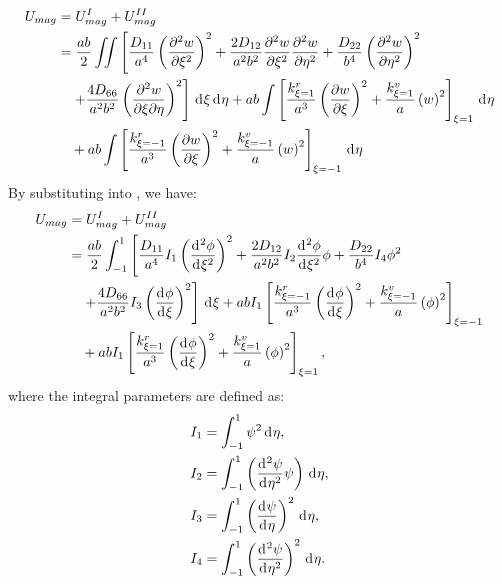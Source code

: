 \documentclass[preprint,12pt]{elsarticle}
\newcommand{\id}{\mathrm{d}\mkern1mu}
\begin{document}
\begin{equation}\label{eq:poten_energy_tolx}
	\begin{split}
		U_{mag} &= U^{I}_{mag} + U^{II}_{mag} \\
		&= \frac{ab}{2} \iint \left[ \frac{D_{11}}{a^4} \left( \frac{\partial^2 w}{\partial \xi^2} \right)^2 + \frac{2 D_{12}}{a^2 b^2} \frac{\partial^2 w}{\partial \xi^2} \frac{\partial^2 w}{\partial \eta^2} + \frac{D_{22}}{b^4} \left( \frac{\partial^2 w}{\partial \eta^2} \right)^2 \right. \\
		&\quad \left.  + \frac{4 D_{66}}{a^2 b^2} \left( \frac{\partial^2 w}{\partial \xi \partial \eta} \right)^2 \right] \, \id\xi \, \id\eta + ab \int \left[\frac{k^r_{\xi=1}}{a^3} \left( \frac{\partial w}{\partial \xi} \right)^2 + \frac{k^v_{\xi=1}}{a} \left( w \right)^2 \right]_{\xi=1} \, \id \eta \\
		&\quad  + ab \int \left[\frac{k^r_{\xi=-1}}{a^3} \left( \frac{\partial w}{\partial \xi} \right)^2 + \frac{k^v_{\xi=-1}}{a} \left( w \right)^2 \right]_{\xi=-1} \, \id \eta
	\end{split}
\end{equation}
%
By substituting  into , we have:
%
\begin{equation}\label{eq:poten_energy_tolx2}
	\begin{split}
		U_{mag}&=U^{I}_{mag}+U^{II}_{mag}\\
		&=\frac{ab}{2} \int_{-1}^{1} \left[ \frac{D_{11}}{a^4}I_1 \left( \frac{\id^2\phi }{\id \xi^2} \right)^2 + \frac{2 D_{12}}{a^2 b^2}I_2 \frac{\id^2\phi }{\id \xi^2}\phi  + \frac{D_{22}}{b^4}I_4  \phi^2 \right. \\
		&\quad \left. + \frac{4 D_{66}}{a^2 b^2}I_3 \left( \frac{\id \phi }{\id \xi}\right)^2 \right] \, \id\xi +abI_1 \left[\frac{k^r_{\xi=-1}}{a^3} \left( \frac{\id \phi}{\id \xi} \right)^2+ \frac{k^v_{\xi=-1}}{a} \left( \phi \right)^2\right]_{\xi=-1}\\
		&\quad+abI_1 \left[\frac{k^r_{\xi=1}}{a^3} \left( \frac{\id \phi}{\id \xi} \right)^2+ \frac{k^v_{\xi=1}}{a} \left( \phi \right)^2\right]_{\xi=1},
	\end{split}
\end{equation}
%
where the integral parameters are defined as:
%
\begin{equation}\label{eq:inte_phi_text}  
	\begin{split}  
		&I_1 = \int_{-1}^{1} \psi^2 \, \id\eta, \\  
		&I_2 = \int_{-1}^{1} \left( \frac{\id^2 \psi}{\id \eta^2} \psi \right) \, \id\eta, \\  
		&I_3 = \int_{-1}^{1} \left( \frac{\id \psi}{\id \eta} \right)^2 \, \id\eta, \\  
		&I_4 = \int_{-1}^{1} \left( \frac{\id^2 \psi}{\id \eta^2} \right)^2 \, \id\eta.  
	\end{split}  
\end{equation}   
\end{document}
